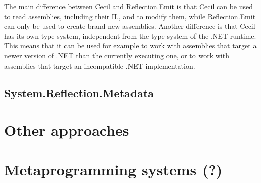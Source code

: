 The main difference between Cecil and Reflection.Emit is that Cecil can be used to read assemblies, including their \ac{IL}, and to modify them, while Reflection.Emit can only be used to create brand new assemblies. Another difference is that Cecil has its own type system, independent from the type system of the .NET runtime. This means that it can be used for example to work with assemblies that target a newer version of .NET than the currently executing one, or to work with assemblies that target an incompatible .NET implementation.

\subsection{System.Reflection.Metadata}

\section{Other approaches}


\section{Metaprogramming systems (?)}
\label{metaprogramming}

